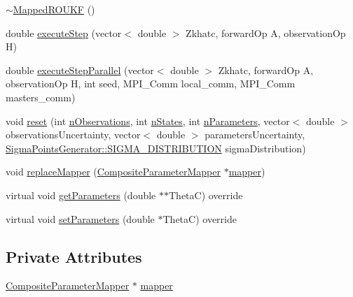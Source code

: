 \begin{DoxyCompactItemize}
\item 
\mbox{\hyperlink{classMappedROUKF_a62754db5475cbfc001f2dc298a2092d0}{$\sim$\+Mapped\+R\+O\+U\+KF}} ()
\item 
double \mbox{\hyperlink{classMappedROUKF_a0a91ee2acdfa66f4f788ebcc920e112a}{execute\+Step}} (vector$<$ double $>$ Zkhatc, forward\+Op A, observation\+Op H)
\item 
double \mbox{\hyperlink{classMappedROUKF_ab6a3f488ef97ee3d8e11efa5aa0385c7}{execute\+Step\+Parallel}} (vector$<$ double $>$ Zkhatc, forward\+Op A, observation\+Op H, int seed, M\+P\+I\+\_\+\+Comm local\+\_\+comm, M\+P\+I\+\_\+\+Comm masters\+\_\+comm)
\item 
void \mbox{\hyperlink{classMappedROUKF_ad4ddf881c1ade83fe0cc2ab99ad58b7e}{reset}} (int \mbox{\hyperlink{classAbstractROUKF_a4f6403f7fd2fac691e4ac516f47c0a06}{n\+Observations}}, int \mbox{\hyperlink{classAbstractROUKF_af9ce480feb5d97761f20fdd546878aff}{n\+States}}, int \mbox{\hyperlink{classAbstractROUKF_a488f708dcdd66758cd879421cd454846}{n\+Parameters}}, vector$<$ double $>$ observations\+Uncertainty, vector$<$ double $>$ parameters\+Uncertainty, \mbox{\hyperlink{classSigmaPointsGenerator_ad6f9474c0313425a10add120e0acf944}{Sigma\+Points\+Generator\+::\+S\+I\+G\+M\+A\+\_\+\+D\+I\+S\+T\+R\+I\+B\+U\+T\+I\+ON}} sigma\+Distribution)
\item 
void \mbox{\hyperlink{classMappedROUKF_ad84ef097844217e5c5342e2ee8968521}{replace\+Mapper}} (\mbox{\hyperlink{classCompositeParameterMapper}{Composite\+Parameter\+Mapper}} $\ast$\mbox{\hyperlink{classMappedROUKF_a5177d0749fa9a6ce81d760267f4e7e09}{mapper}})
\item 
virtual void \mbox{\hyperlink{classMappedROUKF_aa6670e2cc9899b93b71db3f238ae93f3}{get\+Parameters}} (double $\ast$$\ast$ThetaC) override
\item 
virtual void \mbox{\hyperlink{classMappedROUKF_a4d3a109dc95812c8d9c6ac2a489349c2}{set\+Parameters}} (double $\ast$ThetaC) override
\end{DoxyCompactItemize}
\subsection*{Private Attributes}
\begin{DoxyCompactItemize}
\item 
\mbox{\hyperlink{classCompositeParameterMapper}{Composite\+Parameter\+Mapper}} $\ast$ \mbox{\hyperlink{classMappedROUKF_a5177d0749fa9a6ce81d760267f4e7e09}{mapper}}
\end{DoxyCompactItemize}
